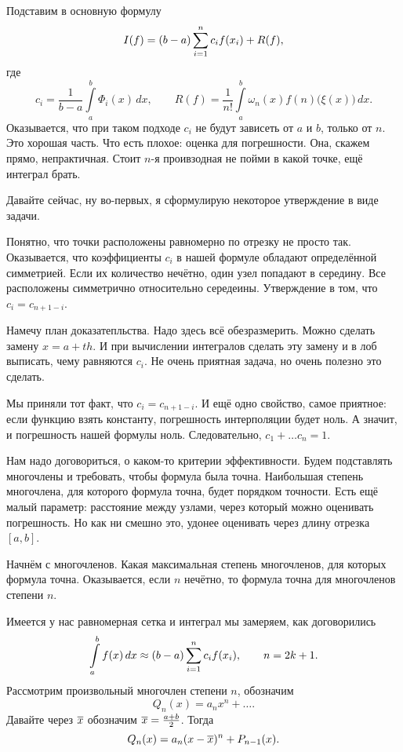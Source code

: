 Подставим в основную формулу 
\[
  I(f) = (b-a)\sum\limits_{i = 1}^{n} c_i f(x_i) + R(f),
\]
где
\[
  c_i = \frac1{b-a} \int\limits_a^b \Phi_i(x)\,dx,\qquad
  R(f) = \frac1{n!} \int\limits_a^b \omega_n(x) f{(n)}\big(\xi(x)\big)\,dx.
\]
Оказывается, что при таком подходе $c_i$ не будут зависеть от $a$ и $b$, только от $n$. Это хорошая часть. Что есть плохое: оценка для погрешности. Она, скажем прямо, непрактичная. Стоит $n$-я проивзодная не пойми в какой точке, ещё интеграл брать.

Давайте сейчас, ну во-первых, я сформулирую некоторое утверждение в виде задачи.
\begin{Ut}
  Понятно, что точки расположены равномерно по отрезку не просто так. Оказывается, что коэффициенты $c_i$ в нашей формуле обладают определённой симметрией. Если их количество нечётно, один узел попадают в середину. Все расположены симметрично относительно середеины. Утверждение в том, что $c_i = c_{n+1-i}$.
\end{Ut}
\begin{Proof}
Намечу план доказатепльства. Надо здесь всё обезразмерить. Можно сделать замену $x= a+ t h$.
И при вычислении интегралов сделать эту замену и в лоб выписать, чему равняются $c_i$. Не очень приятная задача, но очень полезно это сделать.
\end{Proof}

Мы приняли тот факт, что $c_i = c_{n+1-i}$. И ещё одно свойство, самое приятное: если функцию взять константу, погрешность интерполяции будет ноль. А значит, и  погрешность нашей формулы ноль. Следовательно, $c_1+\dots c_n = 1$.

Нам надо договориться, о каком-то критерии эффективности. Будем подставлять многочлены и требовать, чтобы формула была точна. Наибольшая степень многочлена, для которого формула точна, будет порядком точности. Есть ещё малый параметр: расстояние между узлами, через который можно оценивать погрешность. Но как ни смешно это, удонее оценивать через длину отрезка $[a,b]$.

Начнём с многочленов. Какая максимальная степень многочленов, для которых формула точна. Оказывается, если $n$ нечётно, то формула точна для многочленов степени $n$.

Имеется у нас равномерная сетка и интеграл мы замеряем, как договорились
\[
  \int\limits_a^b f(x)\,dx\approx (b-a) \sum\limits_{i = 1}^{n} c_i f(x_i),\qquad n= 2k +1.
\]
Рассмотрим произвольный многочлен степени $n$, обозначим
\[
  Q_n(x) = a_n x^n + \dots.
\]
Давайте через $\overline{x}$ обозначим $\overline{x} = \frac{a+b}2$. Тогда
\[
  Q_n(x) = a_n(x-\overline{x})^n + P_{n-1}(x).
\]

